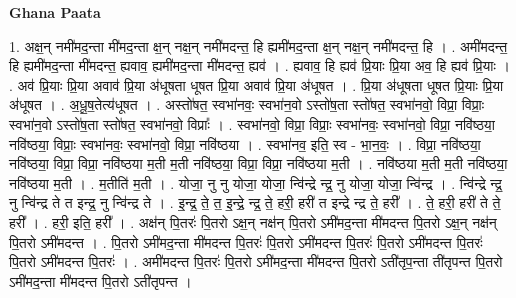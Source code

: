\documentclass[17pt]{extarticle}
\begin{document}
\textbf{Ghana Paata } \newline

1. अक्ष॒न् नमी॑मद॒न्ता मी॑मद॒न्ता क्ष॒न् नक्ष॒न् नमी॑मदन्त॒ हि ह्यमी॑मद॒न्ता क्ष॒न् नक्ष॒न् नमी॑मदन्त॒ हि । . अमी॑मदन्त॒ हि ह्यमी॑मद॒न्ता मी॑मदन्त॒ ह्यवाव॒ ह्यमी॑मद॒न्ता मी॑मदन्त॒ ह्यव॑ । . ह्यवाव॒ हि ह्यव॑ प्रि॒याः प्रि॒या अव॒ हि ह्यव॑ प्रि॒याः । . अव॑ प्रि॒याः प्रि॒या अवाव॑ प्रि॒या अ॑धूषता धूषत प्रि॒या अवाव॑ प्रि॒या अ॑धूषत । . प्रि॒या अ॑धूषता धूषत प्रि॒याः प्रि॒या अ॑धूषत । . अ॒धू॒ष॒तेत्य॑धूषत । . अस्तो॑षत॒ स्वभा॑नवः॒ स्वभा॑न॒वो ऽस्तो॑ष॒ता स्तो॑षत॒ स्वभा॑नवो॒ विप्रा॒ विप्राः॒ स्वभा॑न॒वो ऽस्तो॑ष॒ता स्तो॑षत॒ स्वभा॑नवो॒ विप्राः᳚ । . स्वभा॑नवो॒ विप्रा॒ विप्राः॒ स्वभा॑नवः॒ स्वभा॑नवो॒ विप्रा॒ नवि॑ष्ठया॒ नवि॑ष्ठया॒ विप्राः॒ स्वभा॑नवः॒ स्वभा॑नवो॒ विप्रा॒ नवि॑ष्ठया । . स्वभा॑नव॒ इति॒ स्व - भा॒न॒वः॒ । . विप्रा॒ नवि॑ष्ठया॒ नवि॑ष्ठया॒ विप्रा॒ विप्रा॒ नवि॑ष्ठया म॒ती म॒ती नवि॑ष्ठया॒ विप्रा॒ विप्रा॒ नवि॑ष्ठया म॒ती । . नवि॑ष्ठया म॒ती म॒ती नवि॑ष्ठया॒ नवि॑ष्ठया म॒ती । . म॒तीति॑ म॒ती । . योजा॒ नु नु योजा॒ योजा॒ न्वि॑न्द्रे न्द्र॒ नु योजा॒ योजा॒ न्वि॑न्द्र । . न्वि॑न्द्रे न्द्र॒ नु न्वि॑न्द्र ते त इन्द्र॒ नु न्वि॑न्द्र ते । . इ॒न्द्र॒ ते॒ त॒ इ॒न्द्रे॒ न्द्र॒ ते॒ हरी॒ हरी॑ त इन्द्रे न्द्र ते॒ हरी᳚ । . ते॒ हरी॒ हरी॑ ते ते॒ हरी᳚ । . हरी॒ इति॒ हरी᳚ । . अक्ष॑न् पि॒तरः॑ पि॒तरो ऽक्ष॒न् नक्ष॑न् पि॒तरो ऽमी॑मद॒न्ता मी॑मदन्त पि॒तरो ऽक्ष॒न् नक्ष॑न् पि॒तरो ऽमी॑मदन्त । . पि॒तरो ऽमी॑मद॒न्ता मी॑मदन्त पि॒तरः॑ पि॒तरो ऽमी॑मदन्त पि॒तरः॑ पि॒तरो ऽमी॑मदन्त पि॒तरः॑ पि॒तरो ऽमी॑मदन्त पि॒तरः॑ । . अमी॑मदन्त पि॒तरः॑ पि॒तरो ऽमी॑मद॒न्ता मी॑मदन्त पि॒तरो ऽती॑तृप॒न्ता ती॑तृपन्त पि॒तरो ऽमी॑मद॒न्ता मी॑मदन्त पि॒तरो ऽती॑तृपन्त । \newline
\end{document}

